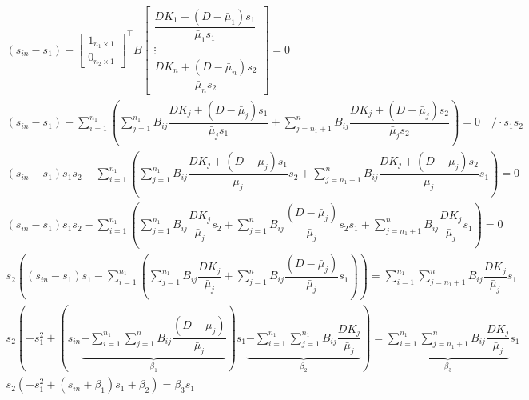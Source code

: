 \documentclass[3p,times]{elsarticle}
\begin{document}
\begin{align}
(s_{in}-s_1)-	\begin{bmatrix}
1_{n_1 \times 1} \\0_{n_2\times 1}
\end{bmatrix}^\top  B\begin{bmatrix}
\dfrac{DK_1+(D-\bar{\mu}_1)s_1}{\bar{\mu}_{1}s_1} \\ \vdots \\ \dfrac{DK_n+(D-\bar{\mu}_n)s_2}{\bar{\mu}_{n}s_2} 
\end{bmatrix} = 0 \\
(s_{in}-s_1) - \sum \limits_{i=1}^{n_1}\left(\sum \limits_{j = 1}^{n_1} B_{ij}\dfrac{DK_j+(D-\bar{\mu}_j)s_1}{\bar{\mu}_{j}s_1} +\sum \limits_{j = n_1+1}^{n} B_{ij}\dfrac{DK_j+(D-\bar{\mu}_j)s_2}{\bar{\mu}_{j}s_2} \right) = 0 \quad / \cdot s_1s_2 \\
(s_{in}-s_1)s_1s_2 - \sum \limits_{i=1}^{n_1}\left(\sum \limits_{j = 1}^{n_1} B_{ij}\dfrac{DK_j+(D-\bar{\mu}_j)s_1}{\bar{\mu}_{j}}s_2 +\sum \limits_{j = n_1+1}^{n} B_{ij}\dfrac{DK_j+(D-\bar{\mu}_j)s_2}{\bar{\mu}_{j}}s_1 \right) = 0 \\
(s_{in}-s_1)s_1s_2 - \sum \limits_{i=1}^{n_1}\left(\sum \limits_{j = 1}^{n_1} B_{ij}\dfrac{DK_j}{\bar{\mu}_{j}}s_2 +\sum \limits_{j = 1}^{n} B_{ij}\dfrac{(D-\bar{\mu}_j)}{\bar{\mu}_{j}}s_2s_1 + \sum \limits_{j = n_1+1}^{n} B_{ij}\dfrac{DK_j}{\bar{\mu}_{j}}s_1 \right) = 0  \\
s_2\left((s_{in}-s_1)s_1 - \sum \limits_{i=1}^{n_1}  \left( \sum \limits_{j = 1}^{n_1} B_{ij}\dfrac{DK_j}{\bar{\mu}_{j}} + \sum \limits_{j = 1}^{n} B_{ij}\dfrac{(D-\bar{\mu}_j)}{\bar{\mu}_{j}}s_1 \right)  \right) =  \sum \limits_{i=1}^{n_1}\sum \limits_{j = n_1+1}^{n} B_{ij}\dfrac{DK_j}{\bar{\mu}_{j}}s_1 \\
s_2\left(-s_{1}^2  +  \left( s_{in}\underbrace{- \sum \limits_{i=1}^{n_1} \sum \limits_{j = 1}^{n} B_{ij}\dfrac{(D-\bar{\mu}_j)}{\bar{\mu}_{j}}}_{\beta_1}\right) s_1 \underbrace{ - \sum \limits_{i=1}^{n_1}  \sum \limits_{j = 1}^{n_1} B_{ij}\dfrac{DK_j}{\bar{\mu}_{j}}}_{\beta_2}  \right) = \underbrace{\sum \limits_{i=1}^{n_1}\sum \limits_{j = n_1+1}^{n} B_{ij}\dfrac{DK_j}{\bar{\mu}_{j}}}_{\beta_3}s_1 \\
s_2\left(-s_{1}^2  +  \left( s_{in}+\beta_1 \right) s_1 +\beta_2  \right) = \beta_3 s_1
\end{align} 
\end{document}
